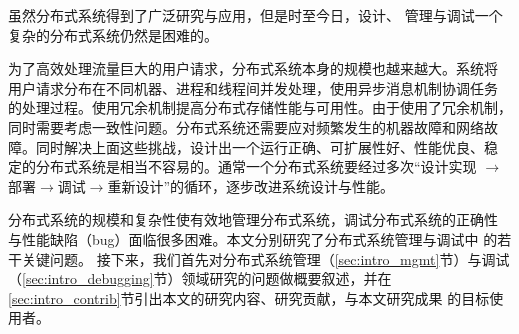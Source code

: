 虽然分布式系统得到了广泛研究与应用，但是时至今日，设计、
管理与调试一个复杂的分布式系统仍然是困难的。

为了高效处理流量巨大的用户请求，分布式系统本身的规模也越来越大。系统将
用户请求分布在不同机器、进程和线程间并发处理，使用异步消息机制协调任务
的处理过程。使用冗余机制提高分布式存储性能与可用性。由于使用了冗余机制，
同时需要考虑一致性问题。分布式系统还需要应对频繁发生的机器故障和网络故
障。同时解决上面这些挑战，设计出一个运行正确、可扩展性好、性能优良、稳
定的分布式系统是相当不容易的。通常一个分布式系统要经过多次“设计实现
$\to$部署$\to$调试$\to$重新设计”的循环，逐步改进系统设计与性能。

分布式系统的规模和复杂性使有效地管理分布式系统，调试分布式系统的正确性
与性能缺陷（bug）面临很多困难。本文分别研究了分布式系统管理与调试中
的若干关键问题。
接下来，我们首先对分布式系统管理（\ref{sec:intro_mgmt}节）与调试
（\ref{sec:intro_debugging}节）领域研究的问题做概要叙述，并在~
\ref{sec:intro_contrib}节引出本文的研究内容、研究贡献，与本文研究成果
的目标使用者。

% 
% 
% 
% 






